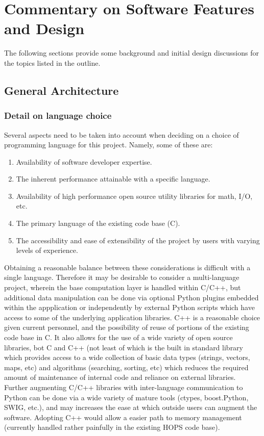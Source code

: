 %
%
\section{Commentary on Software Features and Design}
\label{sec:commentary}

The following sections provide some background and initial
design discussions for the topics listed in the outline.

\subsection{General Architecture}
\label{sec:genarch}

\subsubsection{Detail on language choice}
\label{sec:software-lang}
Several aspects need to be taken into account when deciding on a choice
of programming language for this project. Namely, some of these are:
\begin{enumerate}[itemsep=-1ex]
 \item Availability of software developer expertise.
 \item The inherent performance attainable with a specific language.
 \item Availability of high performance open source utility libraries
  for math, I/O, etc.
 \item The primary language of the existing code base (C).
 \item The accessibility and ease of extensibility of the project by
  users with varying levels of experience.
\end{enumerate}
Obtaining a reasonable balance between these considerations is difficult
with a single language. Therefore it may be desirable to consider a
multi-language project, wherein the base computation layer is handled
within C/C++, but additional data manipulation can be done via optional
Python plugins embedded within the appplication or independently by
external Python scripts which have access to some of the underlying
application libraries.  C++ is a reasonable choice given current
personnel, and the possibility of reuse of portions of the existing code
base in C. It also allows for the use of a wide variety of open source libraries, bot C
and C++ (not least of which is the built in standard library which provides
access to a wide collection of basic data types (strings, vectors, maps, etc) and
algorithms (searching, sorting, etc) which reduces the required amount
of maintenance of internal code and reliance on external libraries.
Further augmenting C/C++ libraries with inter-language
communication to Python can be done via a wide variety of mature tools
(ctypes, boost.Python, SWIG, etc.), and may increases the ease at which
outside users can augment the software.  Adopting C++ would allow a
easier path to memory management (currently handled rather painfully
in the existing HOPS code base).

